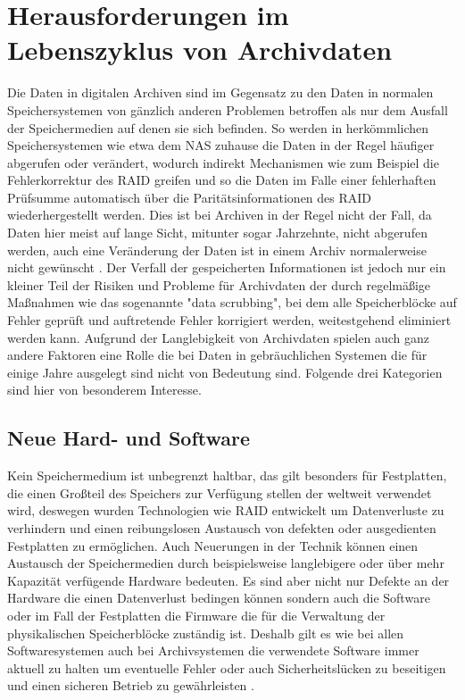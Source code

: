 \documentclass[conference,compsoc,final,a4paper]{IEEEtran}
\begin{document}
\section{Herausforderungen im Lebenszyklus von Archivdaten}
Die Daten in digitalen Archiven sind im Gegensatz zu den Daten in normalen Speichersystemen von gänzlich anderen Problemen betroffen als nur dem Ausfall der Speichermedien auf denen sie sich befinden. So werden in herkömmlichen Speichersystemen wie etwa dem \ac{NAS} zuhause die Daten in der Regel häufiger abgerufen oder verändert, wodurch indirekt Mechanismen wie zum Beispiel die Fehlerkorrektur des \ac{RAID} greifen und so die Daten im Falle einer fehlerhaften Prüfsumme automatisch über die Paritätsinformationen des \ac{RAID} wiederhergestellt werden. Dies ist bei Archiven in der Regel nicht der Fall, da Daten hier meist auf lange Sicht, mitunter sogar Jahrzehnte, nicht abgerufen werden, auch eine Veränderung der Daten ist in einem Archiv normalerweise nicht gewünscht . Der Verfall der gespeicherten Informationen ist jedoch nur ein kleiner Teil der Risiken und Probleme für Archivdaten der durch regelmäßige Maßnahmen wie das sogenannte "data scrubbing", bei dem alle Speicherblöcke auf Fehler geprüft und auftretende Fehler korrigiert werden, weitestgehend eliminiert werden kann. Aufgrund der Langlebigkeit von Archivdaten spielen auch ganz andere Faktoren eine Rolle die bei Daten in gebräuchlichen Systemen die für einige Jahre ausgelegt sind nicht von Bedeutung sind. Folgende drei Kategorien sind hier von besonderem Interesse.

\subsection{Neue Hard- und Software}
Kein Speichermedium ist unbegrenzt haltbar, das gilt besonders für Festplatten, die einen Großteil des Speichers zur Verfügung stellen der weltweit verwendet wird, deswegen wurden Technologien wie \ac{RAID} entwickelt um Datenverluste zu verhindern und einen reibungslosen Austausch von defekten oder ausgedienten Festplatten zu ermöglichen. Auch Neuerungen in der Technik können einen Austausch der Speichermedien durch beispielsweise langlebigere oder über mehr Kapazität verfügende Hardware bedeuten. Es sind aber nicht nur Defekte an der Hardware die einen Datenverlust bedingen können sondern auch die Software oder im Fall der Festplatten die Firmware die für die Verwaltung der physikalischen Speicherblöcke zuständig ist. Deshalb gilt es wie bei allen Softwaresystemen auch bei Archivsystemen die verwendete Software immer aktuell zu halten um eventuelle Fehler oder auch Sicherheitslücken zu beseitigen und einen sicheren Betrieb zu gewährleisten \autocite{Lakshmi2008}.
\end{document}
